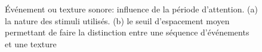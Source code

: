 \begin{figure}[bth]
        \myfloatalign
        \caption[Événement ou texture sonore: influence de la période d'attention]{Événement ou texture sonore: influence de la période d'attention. (a) la nature des stimuli utilisés. (b) le seuil d'espacement moyen permettant de faire la distinction entre une séquence d'événements et une texture}\label{fig:xptexture}
\end{figure}



